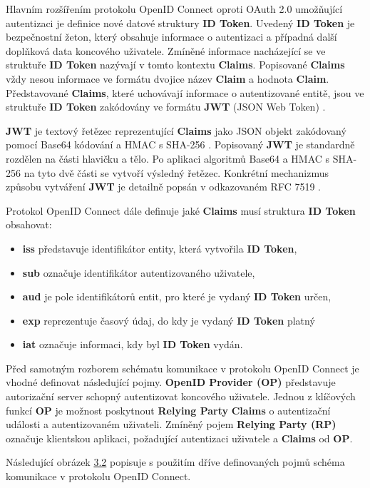 \documentclass[
  printed, %
  twoside, %
  table,   %
  nolof,     %
  nolot,     %
]{fithesis3}
\begin{document}
Hlavním rozšířením protokolu OpenID Connect oproti OAuth 2.0 umožňující autentizaci je definice nové datové struktury \textbf{ID Token}. Uvedený \textbf{ID Token} je bezpečnostní žeton, který obsahuje informace o autentizaci a případná další doplňková data koncového uživatele. Zmíněné informace nacházející se ve struktuře \textbf{ID Token} nazývají v tomto kontextu \textbf{Claims}. Popisované \textbf{Claims} vždy nesou informace ve formátu dvojice název \textbf{Claim} a hodnota \textbf{Claim}. Představované \textbf{Claims}, které uchovávají informace o autentizované entitě, jsou ve struktuře \textbf{ID Token} zakódovány ve formátu \textbf{JWT} (JSON Web Token) \cite{rfc7519}.    

\par

\textbf{JWT} je textový řetězec reprezentující \textbf{Claims} jako JSON objekt \cite{rfc8259}  zakódovaný pomocí Base64 \cite{rfc4648} kódování a HMAC s SHA-256 \cite{rfc4868}. Popisovaný \textbf{JWT} je standardně rozdělen na části hlavičku a tělo. Po aplikaci algoritmů Base64 a HMAC s SHA-256 na tyto dvě části se vytvoří výsledný řetězec. Konkrétní mechanizmus způsobu vytváření \textbf{JWT} je detailně popsán v odkazovaném RFC 7519 \cite{rfc7519}. \par

Protokol OpenID Connect dále definuje jaké \textbf{Claims} musí struktura \textbf{ID Token} obsahovat:

\begin{itemize}
    \item \textbf{iss} představuje identifikátor entity, která vytvořila \textbf{ID Token}, 
    \item \textbf{sub} označuje identifikátor autentizovaného uživatele, 
    \item \textbf{aud} je pole identifikátorů entit, pro které je vydaný \textbf{ID Token} určen,
    \item \textbf{exp} reprezentuje časový údaj, do kdy je vydaný \textbf{ID Token} platný
    \item \textbf{iat} označuje informaci, kdy byl \textbf{ID Token} vydán.
\end{itemize}
\par

Před samotným rozborem schématu komunikace v protokolu OpenID Connect je vhodné definovat následující pojmy. \textbf{OpenID Provider (OP)} představuje autorizační server schopný autentizovat koncového uživatele. Jednou z klíčových funkcí \textbf{OP} je možnost poskytnout \textbf{Relying Party} \textbf{Claims} o autentizační události a autentizovaném uživateli. Zmíněný pojem \textbf{Relying Party (RP)} označuje klientskou aplikaci, požadující autentizaci uživatele a \textbf{Claims} od \textbf{OP}. \par
Následující obrázek \hyperref[fig:oidc]{3.2} popisuje s použitím dříve definovaných pojmů schéma komunikace v protokolu OpenID Connect.
\end{document}
